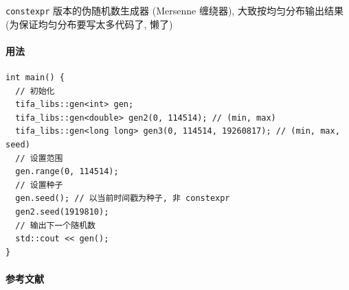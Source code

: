 \verb|constexpr| 版本的伪随机数生成器 (Mersenne 缠绕器), 大致按均匀分布输出结果 (为保证均匀分布要写太多代码了, 懒了)

\paragraph{用法}

\begin{verbatim}
int main() {
  // 初始化
  tifa_libs::gen<int> gen;
  tifa_libs::gen<double> gen2(0, 114514); // (min, max)
  tifa_libs::gen<long long> gen3(0, 114514, 19260817); // (min, max, seed)
  // 设置范围
  gen.range(0, 114514);
  // 设置种子
  gen.seed(); // 以当前时间戳为种子, 非 constexpr
  gen2.seed(1919810);
  // 输出下一个随机数
  std::cout << gen();
}
\end{verbatim}

\paragraph{参考文献} \cite{matsumoto1998mersenne} \cite{szHugyi2013random} \cite{lemire2019fast}

